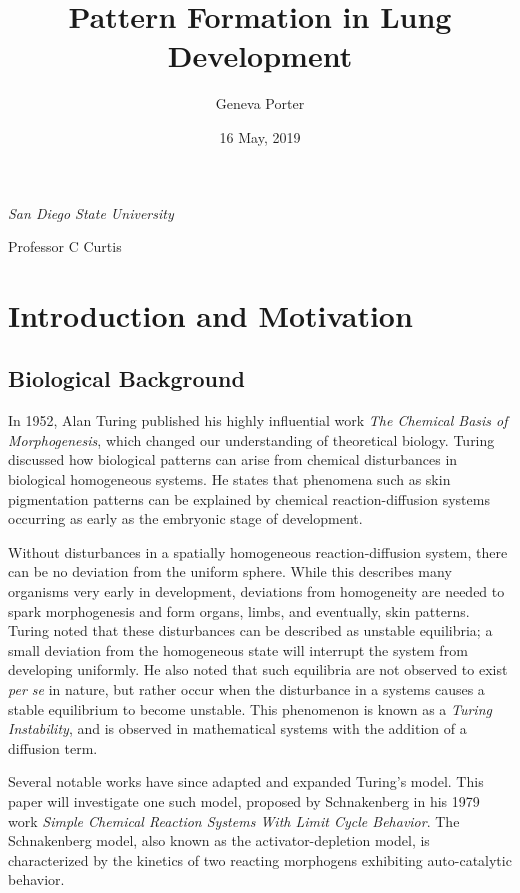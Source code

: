\documentclass[12pt]{article}
\title{Pattern Formation in Lung Development}
\author{Geneva Porter}
\date{16 May, 2019}
\begin{document}
\begin{titlepage}
\maketitle
\thispagestyle{empty}

\begin{center}
	
\large \it San Diego State University 
	
Professor C Curtis

\end{center}
\end{titlepage}

\tableofcontents

\section{Introduction and Motivation}\label{introduction}

\subsection{Biological Background}\label{bio}

In 1952, Alan Turing published his highly influential work {\it The Chemical Basis of Morphogenesis},\cite{Turing1952} which changed our understanding of theoretical biology. Turing discussed how biological patterns can arise from chemical disturbances in biological homogeneous systems. He states that phenomena such as skin pigmentation patterns can be explained by chemical reaction-diffusion systems occurring as early as the embryonic stage of development. 

Without disturbances in a spatially homogeneous reaction-diffusion system, there can be no deviation from the uniform sphere. While this describes many organisms very early in development, deviations from homogeneity are needed to spark morphogenesis and form organs, limbs, and eventually, skin patterns. Turing noted that these disturbances can be described as unstable equilibria; a small deviation from the homogeneous state will interrupt the system from developing uniformly. He also noted that such equilibria are not observed to exist {\it per se} in nature, but rather occur when the disturbance in a systems causes a stable equilibrium to become unstable. This phenomenon is known as a {\it Turing Instability}, and is observed in mathematical systems with the addition of a diffusion term.

Several notable works have since adapted and expanded Turing's model.\cite{Gierer1972}\cite{Lee2000}\cite{Krause2018} This paper will investigate one such model, proposed by Schnakenberg in his 1979 work {\it Simple Chemical Reaction Systems With Limit Cycle Behavior}.\cite{Schnakenberg1979} The Schnakenberg model, also known as the activator-depletion model, is characterized by the kinetics of two reacting morphogens exhibiting auto-catalytic behavior. 
\end{document}

